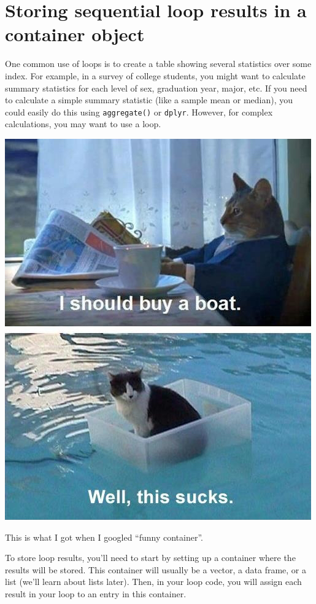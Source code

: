 \documentclass{tufte-book}\usepackage[]{graphicx}\usepackage[]{color}
\begin{document}
\section{Storing sequential loop results in a container object}

One common use of loops is to create a table showing several statistics over some index. For example, in a survey of college students, you might want to calculate summary statistics for each level of sex, graduation year, major, etc. If you need to calculate a simple summary statistic (like a sample mean or median), you could easily do this using \texttt{aggregate()} or \texttt{dplyr}. However, for complex calculations, you may want to use a loop.

\begin{marginfigure}

\includegraphics[width=\linewidth]{catboat.jpg}
\caption{This is what I got when I googled ``funny container''.}
\end{marginfigure}

To store loop results, you'll need to start by setting up a container where the results will be stored. This container will usually be a vector, a data frame, or a list (we'll learn about lists later). Then, in your loop code, you will assign each result in your loop to an entry in this container.
\end{document}

